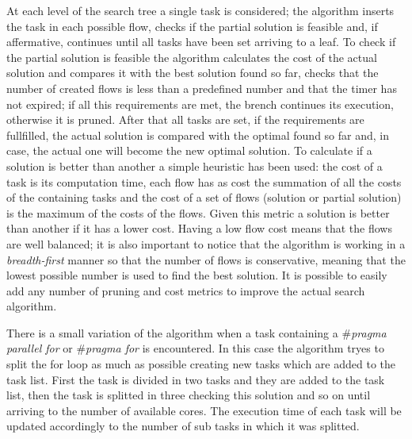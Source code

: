\documentclass[a4paper,11pt,oneside]{book}
\begin{document}
At each level of the search tree a single task is considered; the algorithm inserts the task in each possible flow, checks if the partial solution is feasible and, if affermative, continues until all tasks have been set arriving to a leaf. To check if the partial solution is feasible the algorithm calculates the cost of the actual solution and compares it with the best solution found so far, checks that the number of created flows is less than a predefined number and that the timer has not expired; if all this requirements are met, the brench continues its execution, otherwise it is pruned. After that all tasks are set, if the requirements are fullfilled, the actual solution is compared with the optimal found so far and, in case, the actual one will become the new optimal solution. To calculate if a solution is better than another a simple heuristic has been used: the cost of a task is its computation time, each flow has as cost the summation of all the costs of the containing tasks and the cost of a set of flows (solution or partial solution) is the maximum of the costs of the flows. Given this metric a solution is better than another if it has a lower cost. Having a low flow cost means that the flows are well balanced; it is also important to notice that the algorithm is working in a \emph{breadth-first} manner so that the number of flows is conservative, meaning that the lowest possible number is used to find the best solution. It is possible to easily add any number of pruning and cost metrics to improve the actual search algorithm.

There is a small variation of the algorithm when a task containing a \emph{$\#$pragma parallel for} or \emph{$\#$pragma for} is encountered. In this case the algorithm tryes to split the for loop as much as possible creating new tasks which are added to the task list. First the task is divided in two tasks and they are added to the task list, then the task is splitted in three checking this solution and so on until arriving to the number of available cores. The execution time of each task will be updated accordingly to the number of sub tasks in which it was splitted. 
\end{document}
